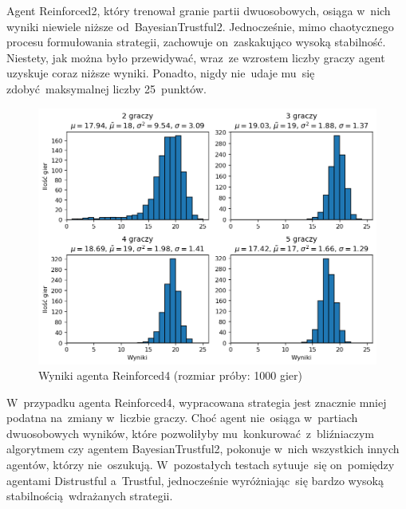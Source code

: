 \documentclass[declaration,shortabstract,inz]{iithesis}
\begin{document}
Agent Reinforced2, który trenował granie partii dwuosobowych, osiąga w~nich wyniki niewiele niższe od~BayesianTrustful2. Jednocześnie, mimo chaotycznego procesu formułowania strategii, zachowuje on~zaskakująco wysoką stabilność. Niestety, jak można było przewidywać, wraz~ze wzrostem liczby graczy agent uzyskuje coraz niższe wyniki. Ponadto, nigdy nie~udaje mu~się zdobyć maksymalnej liczby 25~punktów.

\begin{figure}[H]
	\centering
	\captionsetup{format=hang}
	\includegraphics[width=\textwidth,height=\textheight,keepaspectratio]{Reinforced4.png}
	\caption[Caption]{Wyniki agenta Reinforced4 (rozmiar próby: 1000 gier)}
	\label{fig:Reinforced4}
\end{figure}

W~przypadku agenta Reinforced4, wypracowana strategia jest znacznie mniej podatna na~zmiany w~liczbie graczy. Choć agent nie~osiąga w~partiach dwuosobowych wyników, które pozwoliłyby mu~konkurować z~bliźniaczym algorytmem czy agentem BayesianTrustful2, pokonuje w~nich wszystkich innych agentów, którzy nie~oszukują. W~pozostałych testach sytuuje~się on~pomiędzy agentami Distrustful a~Trustful, jednocześnie wyróżniając~się bardzo wysoką stabilnością wdrażanych strategii.
\end{document}
